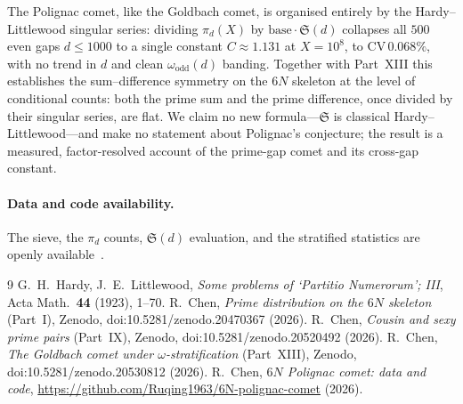 \documentclass[11pt]{article}
\begin{document}
The Polignac comet, like the Goldbach comet, is organised entirely by the
Hardy--Littlewood singular series: dividing $\pi_d(X)$ by
$\mathrm{base}\cdot\mathfrak{S}(d)$ collapses all $500$ even gaps $d\le1000$ to a
single constant $C\approx1.131$ at $X=10^8$, to $\mathrm{CV}\,0.068\%$, with no
trend in $d$ and clean $\omega_{\mathrm{odd}}(d)$ banding. Together with
Part~XIII this establishes the sum--difference symmetry on the $6N$ skeleton at
the level of conditional counts: both the prime sum and the prime difference, once
divided by their singular series, are flat. We claim no new formula---$\mathfrak{S}$
is classical Hardy--Littlewood---and make no statement about Polignac's conjecture;
the result is a measured, factor-resolved account of the prime-gap comet and its
cross-gap constant.

\paragraph{Data and code availability.}
The sieve, the $\pi_d$ counts, $\mathfrak{S}(d)$ evaluation, and the stratified
statistics are openly available~\cite{repo}.

\begin{thebibliography}{9}
 G.~H.~Hardy, J.~E.~Littlewood, \emph{Some problems of `Partitio
Numerorum'; III}, Acta Math.\ \textbf{44} (1923), 1--70.
 R.~Chen, \emph{Prime distribution on the $6N$ skeleton} (Part~I),
Zenodo, doi:10.5281/zenodo.20470367 (2026).
 R.~Chen, \emph{Cousin and sexy prime pairs} (Part~IX), Zenodo,
doi:10.5281/zenodo.20520492 (2026).
 R.~Chen, \emph{The Goldbach comet under $\omega$-stratification}
(Part~XIII), Zenodo, doi:10.5281/zenodo.20530812 (2026).
 R.~Chen, \emph{$6N$ Polignac comet: data and code},
\url{https://github.com/Ruqing1963/6N-polignac-comet} (2026).
\end{thebibliography}
\end{document}
